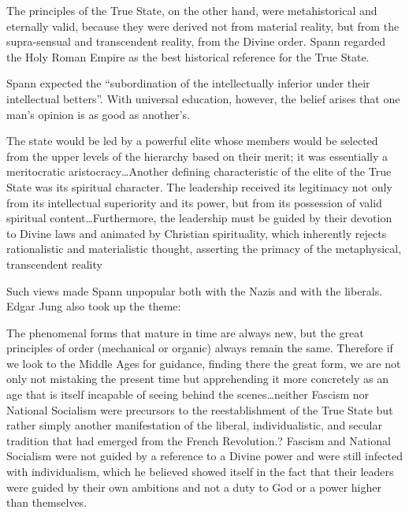 \begin{quotex}
The principles of the True State, on the other hand, were metahistorical and eternally valid, because they were derived
not from material reality, but from the supra-sensual and transcendent reality, from the Divine order. Spann regarded
the Holy Roman Empire as the best historical reference for the True State. 

\end{quotex}
Spann expected the “subordination of the intellectually inferior under their intellectual betters”. With universal
education, however, the belief arises that one man's opinion is as good as another's.

\begin{quotex}
The state would be led by a powerful elite whose members would be selected from the upper levels of the hierarchy based
on their merit; it was essentially a meritocratic aristocracy…Another defining characteristic of the elite of the True
State was its spiritual character. The leadership received its legitimacy not only from its intellectual superiority
and its power, but from its possession of valid spiritual content…Furthermore, the leadership must be guided by their
devotion to Divine laws and animated by Christian spirituality, which inherently rejects rationalistic and
materialistic thought, asserting the primacy of the metaphysical, transcendent reality 

\end{quotex}
Such views made Spann unpopular both with the Nazis and with the liberals. Edgar Jung also took up the theme:

\begin{quotex}
The phenomenal forms that mature in time are always new, but the great principles of order (mechanical or organic)
always remain the same. Therefore if we look to the Middle Ages for guidance, finding there the great form, we are not
only not mistaking the present time but apprehending it more concretely as an age that is itself incapable of seeing
behind the scenes…neither Fascism nor National Socialism were precursors to the reestablishment of the True State but
rather simply another manifestation of the liberal, individualistic, and secular tradition that had emerged from the
French Revolution.? Fascism and National Socialism were not guided by a reference to a Divine power and were still
infected with individualism, which he believed showed itself in the fact that their leaders were guided by their own
ambitions and not a duty to God or a power higher than themselves. 

\end{quotex}
